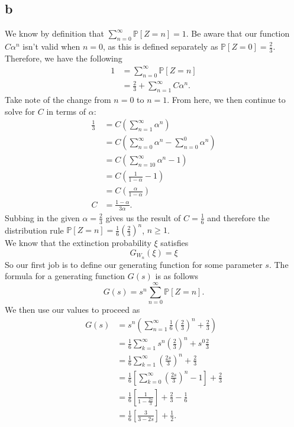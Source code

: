 \documentclass{article}
\newcommand{\Prob}{\mathbb{P}}
\begin{document}
\subsection{b}
We know by definition that $\sum_{n=0}^\infty \Prob[Z=n]=1$. Be aware that our function $C\alpha^n$ isn't valid when $n=0$, as this is defined separately as $\Prob[Z=0]=\frac{2}{3}$. Therefore, we have the following
\begin{align}
    1 &= \sum_{n=0}^\infty \Prob[Z=n] \\
    &= \frac{2}{3} + \sum_{n=1}^\infty C\alpha^n.
\end{align}
Take note of the change from $n=0$ to $n=1$. From here, we then continue to solve for $C$ in terms of $\alpha$:
\begin{align}
    \frac{1}{3} &= C\left( \sum_{n=1}^\infty \alpha^n \right) \\
    &= C\left( \sum_{n=0}^\infty \alpha^n - \sum_{n=0}^0 \alpha^n \right) \\
    &= C\left( \sum_{n=10}^\infty \alpha^n - 1\right) \\
    &= C\left( \frac{1}{1-\alpha}-1 \right) \\
    &= C\left( \frac{\alpha}{1-\alpha} \right) \\
    C &= \frac{1-\alpha}{3\alpha}.
\end{align}
Subbing in the given $\alpha = \frac{2}{3}$ gives us the result of $C=\frac{1}{6}$ and therefore the distribution rule $\Prob[Z=n]=\frac{1}{6}\left( \frac{2}{3} \right)^n$, $n\geq 1$. \\
We know that the extinction probability $\xi$ satisfies 
\begin{equation}
    G_{W_n}(\xi) = \xi
\end{equation}
So our first job is to define our generating function for some parameter $s$. The formula for a generating function $G(s)$ is as follows
\begin{equation}
    G(s) = s^n\sum_{n=0}^\infty \Prob[Z=n].
\end{equation}
We then use our values to proceed as
\begin{align}
    G(s) &= s^n\left( \sum_{n=1}^\infty \frac{1}{6}\left( \frac{2}{3} \right)^n + \frac{2}{3}\right) \\
    &= \frac{1}{6}\sum_{k=1}^\infty s^n\left( \frac{2}{3} \right)^n + s^0\frac{2}{3} \\
    &= \frac{1}{6}\sum_{k=1}^\infty \left( \frac{2s}{3} \right)^n + \frac{2}{3} \\
    &= \frac{1}{6}\left[ \sum_{k=0}^\infty \left( \frac{2s}{3} \right)^n -1 \right] + \frac{2}{3} \\
    &= \frac{1}{6}\left[ \frac{1}{1-\frac{2s}{3}} \right] + \frac{2}{3} - \frac{1}{6} \\
    &= \frac{1}{6}\left[ \frac{3}{3-2s} \right] + \frac{1}{2}.\\
\end{align}
\end{document}
